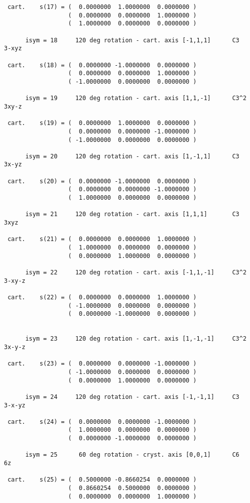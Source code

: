 \documentclass[12pt,a4paper]{article}
\begin{document}
\begin{footnotesize}
\begin{verbatim}
 cart.    s(17) = (  0.0000000  1.0000000  0.0000000 )
                  (  0.0000000  0.0000000  1.0000000 )
                  (  1.0000000  0.0000000  0.0000000 )

      isym = 18     120 deg rotation - cart. axis [-1,1,1]      C3     3-xyz

 cart.    s(18) = (  0.0000000 -1.0000000  0.0000000 )
                  (  0.0000000  0.0000000  1.0000000 )
                  ( -1.0000000  0.0000000  0.0000000 )

      isym = 19     120 deg rotation - cart. axis [1,1,-1]      C3^2   3xy-z

 cart.    s(19) = (  0.0000000  1.0000000  0.0000000 )
                  (  0.0000000  0.0000000 -1.0000000 )
                  ( -1.0000000  0.0000000  0.0000000 )

      isym = 20     120 deg rotation - cart. axis [1,-1,1]      C3     3x-yz

 cart.    s(20) = (  0.0000000 -1.0000000  0.0000000 )
                  (  0.0000000  0.0000000 -1.0000000 )
                  (  1.0000000  0.0000000  0.0000000 )

      isym = 21     120 deg rotation - cart. axis [1,1,1]       C3     3xyz

 cart.    s(21) = (  0.0000000  0.0000000  1.0000000 )
                  (  1.0000000  0.0000000  0.0000000 )
                  (  0.0000000  1.0000000  0.0000000 )

      isym = 22     120 deg rotation - cart. axis [-1,1,-1]     C3^2   3-xy-z

 cart.    s(22) = (  0.0000000  0.0000000  1.0000000 )
                  ( -1.0000000  0.0000000  0.0000000 )
                  (  0.0000000 -1.0000000  0.0000000 )


      isym = 23     120 deg rotation - cart. axis [1,-1,-1]     C3^2   3x-y-z

 cart.    s(23) = (  0.0000000  0.0000000 -1.0000000 )
                  ( -1.0000000  0.0000000  0.0000000 )
                  (  0.0000000  1.0000000  0.0000000 )

      isym = 24     120 deg rotation - cart. axis [-1,-1,1]     C3     3-x-yz

 cart.    s(24) = (  0.0000000  0.0000000 -1.0000000 )
                  (  1.0000000  0.0000000  0.0000000 )
                  (  0.0000000 -1.0000000  0.0000000 )

      isym = 25      60 deg rotation - cryst. axis [0,0,1]      C6     6z

 cart.    s(25) = (  0.5000000 -0.8660254  0.0000000 )
                  (  0.8660254  0.5000000  0.0000000 )
                  (  0.0000000  0.0000000  1.0000000 )


\end{verbatim}
\end{footnotesize}
\end{document}
